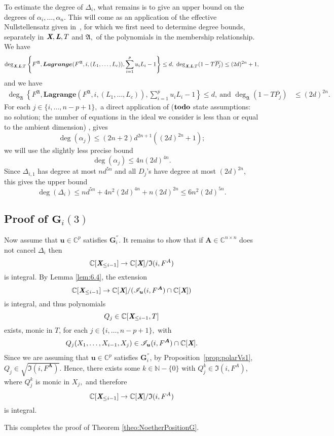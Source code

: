 \documentclass[a4paper]{article}
\def\A{\mathfrak{A}}
\def\Lb{\textit{\textbf{L}}}
\def\Xb{\textit{\textbf{X}}}
\def\mA{{\bm A}}
\def\ub{{\bm u}}
\def\pjb{\overline{P_{j}}}
\def\D{\Delta}
\def\C{\mathbb{C}}
\def\IiA{\mathfrak{I}(i,F^A)}
\def\IiAr{\sqrt{\mathfrak{I}(i,F^{\mA})}}
\def\lagFfA{{\bm{Lagrange}}(F^{\A},i,(L_1,\hdots,L_c))}
\def\IilA{\mathscr{I}_{\ub}(i,F^{\mA})}
\def\udl{\sum_{i=1}^pu_iL_i}
\def\td{{\bf todo}}
\begin{document}
\noindent
To estimate the degree of $\D_{i}$, what remains is to give an upper
bound on the degrees of $\alpha_i,\dots,\alpha_n$. This will come as an
application of the effective Nullstellensatz given in~\cite{EN}, for
which we first need to determine degree bounds, separately in $\Xb,\Lb,T$
and $\A,$ of the polynomials in the membership relationship. We have
\begin{align*}
\deg_{\Xb,\Lb,T}
\left\{ 
F^{\A},\lagFfA, \udl-1
\right\}
\leq d, ~
\deg_{\Xb,\Lb,T}(1-T\pjb) \leq (2d)^{2n} +1, 
\end{align*}
and we have 
\begin{align*}
\deg_{\A}  
\left\{ 
F^{\A},\lagFfA, \udl-1
\right\} 
\leq d,~\textrm{and }
\deg_{\A}(1-T\pjb)& \leq (2d)^{2n}.
\end{align*}
For each $j \in \{i,\hdots,n-p+1\},$ a direct application of ($\td$ state assumptions: no solution; the number of equations in the ideal we consider is less than or equal to the ambient dimension) \cite[Theorem
0.5]{EN}, gives 
\[
\deg(\alpha_j) \le (2n+2)d^{2n+1}((2d)^{2n}+1);
\]
we will use
the slightly less precise bound \[\deg(\alpha_j) \le 4n(2d)^{4n}.\] Since $\D_{i,1}$ has degree at most
$nd^{5n}$ and all $D_j$'s have degree at most $(2d)^{2n}$, this gives
the upper bound
$$\deg(\D_i) \le nd^{5n} +  4n^2(2d)^{4n} + n(2d)^{2n} \leq 6n^2(2d)^{5n}.$$


\subsection{Proof of $\textbf{G}_i(3)$}
Now assume that $\ub \in \C^p$ satisfies $\bm G_i^{''}$. It remains to show that if $\mA \in \C^{n\times n}$ does not cancel $\D_{i}$ then
\[
 \C[\Xb_{\leq i-1}]\rightarrow \C[\Xb]/\IiA
\]
is integral. 
\noindent
By Lemma \ref{lem:6.4}, the extension
\[
 \C[\Xb_{\leq i-1}]\rightarrow \C[\Xb]/(\IilA \cap \C[\Xb])
\]
is integral, and thus polynomials 
\[
Q_j \in \C[\Xb_{\leq i-1},T]
\]
exists, monic in $T$, for each $j \in \{i,\hdots,n-p+1\},$ with
\begin{align*}
Q_j(X_1,\hdots,X_{i-1},X_j) \in \IilA \cap \C[\Xb].
\end{align*}
%
Since we are assuming that $\ub \in \C^p$ satisfies $\bm G_i^{''}$, by Proposition~\ref{prop:polarVs1}, $Q_j \in \IiAr.$ Hence, there exists some $k \in \mathbb{N}-\{0\}$ with $Q_j^{k} \in\IiA$, where $Q_j^k$ is monic in $X_j,$ and therefore
\[
 \C[\Xb_{\leq i-1}]\rightarrow \C[\Xb]/\IiA
\]
is integral.
\par 
This completes the proof of Theorem \ref{theo:NoetherPositionG}.
\end{document}
